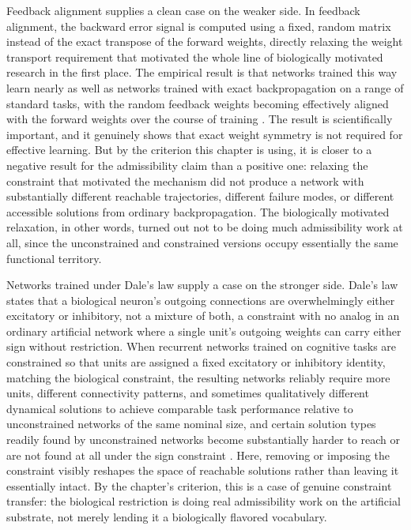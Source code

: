 \documentclass[11pt]{book}
\begin{document}
Feedback alignment supplies a clean case on the weaker side. In feedback alignment, the backward error signal is computed using a fixed, random matrix instead of the exact transpose of the forward weights, directly relaxing the weight transport requirement that motivated the whole line of biologically motivated research in the first place. The empirical result is that networks trained this way learn nearly as well as networks trained with exact backpropagation on a range of standard tasks, with the random feedback weights becoming effectively aligned with the forward weights over the course of training \cite{lillicrap2016}. The result is scientifically important, and it genuinely shows that exact weight symmetry is not required for effective learning. But by the criterion this chapter is using, it is closer to a negative result for the admissibility claim than a positive one: relaxing the constraint that motivated the mechanism did not produce a network with substantially different reachable trajectories, different failure modes, or different accessible solutions from ordinary backpropagation. The biologically motivated relaxation, in other words, turned out not to be doing much admissibility work at all, since the unconstrained and constrained versions occupy essentially the same functional territory.

Networks trained under Dale's law supply a case on the stronger side. Dale's law states that a biological neuron's outgoing connections are overwhelmingly either excitatory or inhibitory, not a mixture of both, a constraint with no analog in an ordinary artificial network where a single unit's outgoing weights can carry either sign without restriction. When recurrent networks trained on cognitive tasks are constrained so that units are assigned a fixed excitatory or inhibitory identity, matching the biological constraint, the resulting networks reliably require more units, different connectivity patterns, and sometimes qualitatively different dynamical solutions to achieve comparable task performance relative to unconstrained networks of the same nominal size, and certain solution types readily found by unconstrained networks become substantially harder to reach or are not found at all under the sign constraint \cite{song2016}. Here, removing or imposing the constraint visibly reshapes the space of reachable solutions rather than leaving it essentially intact. By the chapter's criterion, this is a case of genuine constraint transfer: the biological restriction is doing real admissibility work on the artificial substrate, not merely lending it a biologically flavored vocabulary.
\end{document}

